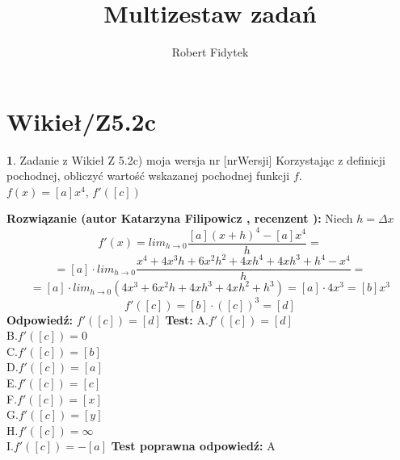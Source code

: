 \documentclass[12pt, a4paper]{article}
\title{Multizestaw zadań}
\author{Robert Fidytek}
\date{}
\theoremstyle{definition} %
\newtheorem{zad}{}
\newcommand{\kategoria}[1]{\section{#1}} %
\newcommand{\zadStart}[1]{\begin{zad}#1\newline} %
\newcommand{\zadStop}{\end{zad}}   %
\newcommand{\rozwStart}[2]{\noindent \textbf{Rozwiązanie (autor #1 , recenzent #2): }\newline} %
\newcommand{\rozwStop}{\newline}                                            %
\newcommand{\odpStart}{\noindent \textbf{Odpowiedź:}\newline}    %
\newcommand{\odpStop}{\newline}                                             %
\newcommand{\testStart}{\noindent \textbf{Test:}\newline} %
\newcommand{\testStop}{\newline} %
\newcommand{\kluczStart}{\noindent \textbf{Test poprawna odpowiedź:}\newline} %
\newcommand{\kluczStop}{\newline} %
\begin{document}
\maketitle


\kategoria{Wikieł/Z5.2c}
\zadStart{Zadanie z Wikieł Z 5.2c) moja wersja nr [nrWersji]}
Korzystając z definicji pochodnej, obliczyć wartość wskazanej pochodnej funkcji $f$.\\
$f(x)=[a]x^4 $, $f'([c])$
\zadStop
\rozwStart{Katarzyna Filipowicz}{}
Niech $h=\Delta x$
$$
f'(x)=lim_{h\rightarrow 0} \frac{[a](x+h)^4-[a]x^4}{h}=
$$ $$
=[a]\cdot lim_{h\rightarrow 0}\frac{x^4+4x^3h+6x^2h^2+4xh^4+4xh^3+h^4-x^4}{h}=
$$ $$
=[a]\cdot lim_{h\rightarrow 0} (4x^3+6x^2h+4xh^3+4xh^2+h^3)=[a] \cdot 4x^3 = [b]x^3
$$ $$
f'([c])=[b] \cdot ([c])^3=[d]
$$
\rozwStop
\odpStart
$f'([c])=[d]$
\odpStop
\testStart
A.$f'([c])=[d]$\\
B.$f'([c])=0$\\
C.$f'([c])=[b]$\\
D.$f'([c])=[a]$\\
E.$f'([c])=[c]$\\
F.$f'([c])=[x]$\\
G.$f'([c])=[y]$\\
H.$f'([c])=\infty$\\
I.$f'([c])=-[a]$
\testStop
\kluczStart
A
\kluczStop
\end{document}
